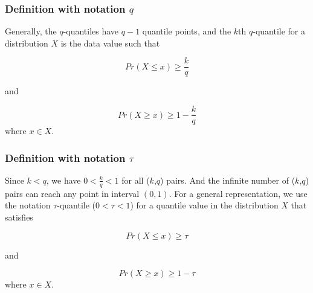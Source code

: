         
    \subsubsection{Definition with notation $q$} \label{q-quantile-def}
    Generally, the $q$-quantiles have $q-1$ quantile points, and the $k$th $q$-quantile for a 
    distribution $X$ is the data value such that
    
    \begin{equation}
        Pr(X \leq x) \geq \frac{k}{q}
    \end{equation}
    
    and
    
    \begin{equation}
        Pr(X \geq x) \geq 1 - \frac{k}{q}
    \end{equation}
    where $x \in X$.

    \subsubsection{Definition with notation $\tau$} \label{tau-quantile-def}
    Since $k < q$, we have $0 < \frac{k}{q} < 1$ for all ($k$,$q$) pairs. And the infinite number of ($k$,$q$) pairs can reach any point in interval $(0,1)$. For a general representation, we use the notation $\tau$-quantile ($0 < \tau < 1$) for a quantile value in the distribution $X$ that satisfies

    \begin{equation}
        Pr(X \leq x) \geq \tau
    \end{equation}
    
    and
    
    \begin{equation}
        Pr(X \geq x) \geq 1 - \tau
    \end{equation}
    where $x \in X$.
